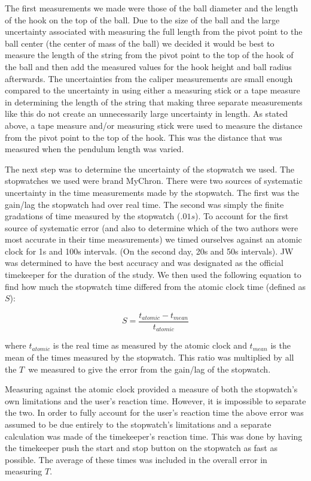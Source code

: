 \documentclass[iop,numberedappendix,appendixfloats]{emulateapj}
\def\T{$T$}
\begin{document}
The first measurements we made were those of the ball diameter and the length 
of the hook on the top of the ball.  Due to the size of 
the ball and the large uncertainty associated with measuring the full length 
from the pivot point to the ball center (the center of mass of the
ball) we decided it would be best to measure the length of the string from the
pivot point to the top of the hook of the ball and then add the measured values 
for the hook height and ball radius afterwards.  The uncertainties from the 
caliper measurements are small enough compared to the uncertainty in using 
either a measuring stick or a tape measure in determining the length of the
string that making three separate measurements like this do not create an 
unnecessarily large uncertainty in length.  As stated above, a tape measure 
and/or measuring stick were used to measure the distance from the pivot point
to the top of the hook.  This was the distance that was measured when the
pendulum length was varied.

The next step was to determine the uncertainty of the stopwatch we used.  The
stopwatches we used were brand MyChron.  There were two sources of systematic 
uncertainty in the time measurements made by the stopwatch.  The first was the 
gain/lag the stopwatch had over real time.  The second was simply the finite 
gradations of time measured by the stopwatch ($.01 s$).  To account for the 
first source of systematic error (and also to determine which of the two 
authors were most accurate in their time measurements) we timed 
ourselves against an atomic clock for 1s and 100s intervals.  (On the second
day, 20s and 50s intervals). JW 
was determined to have the best accuracy and was 
designated as the official timekeeper for the duration of the study.  
We then used the following equation to find how much the stopwatch time
differed from the atomic clock time (defined as $S$):

\begin{equation}
\label{eq:S}
S=\frac{t_{atomic}-t_{mean}}{t_{atomic}} 
\end{equation}

where $t_{atomic}$ is the real time as measured by the 
atomic clock 
and $t_{mean}$ is the mean of the times measured by the 
stopwatch.  This ratio was multiplied by all the \T\ we measured to give
the error from the gain/lag of the stopwatch.

Measuring against the atomic clock provided a measure of both the stopwatch's 
own limitations and the user's reaction time.  However, it is impossible to 
separate the two.  In order to fully account for the user's reaction time the 
above error was assumed to be due entirely to the stopwatch's limitations and 
a separate calculation was made of the timekeeper's reaction time.  This was 
done by having the timekeeper push the start and stop button on the 
stopwatch as fast as possible.  The average of these times was included in 
the overall error in measuring \T.
\end{document}
